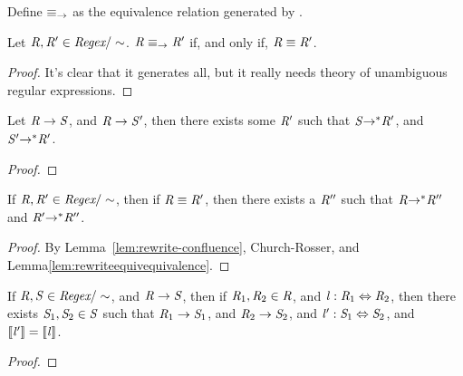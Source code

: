 \documentclass[numbers]{sigplanconf}
\begin{document}
\begin{definition}[$\equiv_{\Rewrite}$]
Define $\equiv_{\Rewrite}$ as the equivalence relation generated by \Rewrite{}.
\end{definition}

\begin{lemma}
\label{lem:rewriteequivequivalence}
Let $\mathit{R},\mathit{R}'\in\textit{Regex}/\sim$.
$\mathit{R}\equiv_{\rightarrow}\mathit{R}'$ if, and only if, $\mathit{R}\equiv\mathit{R}'$.
\end{lemma}
\begin{proof}
It's clear that it generates all, but it really needs theory of unambiguous
regular expressions.
\end{proof}

\begin{lemma}
\label{lem:rewrite-confluence}
Let $\mathit{R}\rightarrow\mathit{S}$, and $\mathit{R}\rightarrow\mathit{S}'$, then there
exists some $\mathit{R}'$ such that $\mathit{S}{\rightarrow}^*\mathit{R}'$,
and $\mathit{S}'{\rightarrow}^*\mathit{R}'$.
\end{lemma}
\begin{proof}
\end{proof}

\begin{lemma}
If $\mathit{R}, \mathit{R}' \in \textit{Regex}/\sim$, then if $\mathit{R}\equiv\mathit{R}'$, then
there exists a $\mathit{R}''$ such that $\mathit{R}{\rightarrow}^*\mathit{R}''$ and
$\mathit{R}'{\rightarrow}^*\mathit{R}''$.
\end{lemma}
\begin{proof}
By Lemma~\ref{lem:rewrite-confluence}, Church-Rosser, and
Lemma\ref{lem:rewriteequivequivalence}.
\end{proof}

\begin{lemma}
\label{lem:rewrite-semantic-retention}
If $\mathit{R},\mathit{S}\in\textit{Regex}/\sim$, and
$\mathit{R}\rightarrow\mathit{S}$, then if $\mathit{R}_1,\mathit{R}_2\in\mathit{R}$, and
$\mathit{l} : \mathit{R}_1 \Leftrightarrow \mathit{R}_2$, then there exists
$\mathit{S}_1,\mathit{S}_2\in\mathit{S}$ such that $\mathit{R}_1\rightarrow\mathit{S}_1$,
and $\mathit{R}_2\rightarrow\mathit{S}_2$, and
$\mathit{l}' : \mathit{S}_1 \Leftrightarrow \mathit{S}_2$,
and $[ \! [\mathit{l}'] \! ]=[ \! [\mathit{l}] \! ]$.
\end{lemma}
\begin{proof}
\end{proof}
\end{document}
